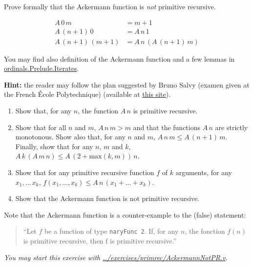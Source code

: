 \begin{project}
Prove formally that the Ackermann function is \emph{not} primitive recursive.


\begin{align}
A\,0\,m&=m+1\\
A\,(n+1)\,0 &= A\,n\,1\\
A\,(n+1)\,(m+1)&= A\,n\,(A\,(n+1)\,m)
\end{align}

You may find also  definition of the Ackermann function and a few  lemmas in
 \href{../theories/ordinals/Prelude/Iterates.html}%
{ordinals.Prelude.Iterates}. 

\textbf{Hint:} the reader may follow the plan suggested by Bruno Salvy (examen given at the French \'Ecole Polytechnique) (available at
\href{http://www.enseignement.polytechnique.fr/informatique/INF412/uploads/Main/pc-primrec-sujet2014.pdf}{this site}).

\begin{enumerate}
\item Show that, for any $n$, the function $A\,n$ is primitive recursive.
\item Show that for all $n$ and $m$, $A\,n\,m > m$ and  that the functions $A\,n$ are strictly monotonous.
Show also that, for any $n$ and $m$, $A\,n\,m \leq A\,(n+1)\,m$.
         Finally, show that for any $n$, $m$ and $k$, 
$A\,k\,(A\,m\,n)\leq A\,(2+\textrm{max}(k,m))\,n$.
\item Show that for any primitive recursive function $f$ of $k$ arguments,
for any $x_1,\dots\,x_k$, $f(x_1,\dots,x_k)\leq A\,n\,(x_1+\dots+x_k)$.
\item Show that the Ackermann function is not primitive recursive.
      
\end{enumerate}

\begin{remark}
Note that the Ackermann function is a counter-example to the (false) statement:
\begin{quote}
{\color{red}
  ``Let $f$ be a function of type \texttt{naryFunc\,2}. If, for any $n$, the fonction $f(n)$ is primitive recursive, then f is primitive recursive.''}
\end{quote}
\end{remark}

\emph{You may start this exercise with
\url{../exercises/primrec/AckermannNotPR.v}.}


\end{project}


